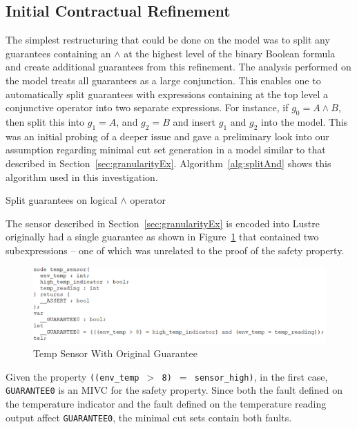 \subsection{Initial Contractual Refinement}
\label{sec:granularityANDAlg}
The simplest restructuring that could be done on the model was to split any guarantees containing an $\land$ at the highest level of the binary Boolean formula and create additional guarantees from this refinement. The analysis performed on the model treats all guarantees as a large conjunction. This enables one to automatically split guarantees with expressions containing at the top level a conjunctive operator into two separate expressions. For instance, if $g_0 = A \land B$, then split this into $g_1 = A$, and $g_2 = B$ and insert $g_1$ and $g_2$ into the model. This was an initial probing of a deeper issue and gave a preliminary look into our assumption regarding minimal cut set generation in a model similar to that described in Section~\ref{sec:granularityEx}. Algorithm~\ref{alg:splitAnd} shows this algorithm used in this investigation. 

\begin{algorithm}[h]

	\caption{Split guarantees on logical $\land$ operator}
	\label{alg:splitAnd}
\end{algorithm}

The sensor described in Section~\ref{sec:granularityEx} is encoded into Lustre originally had a single guarantee as shown in Figure~\ref{fig:lustreOneGuar} that contained two subexpressions -- one of which was unrelated to the proof of the safety property.
\begin{figure}[h!]
\begin{center}
\includegraphics[width=1.0\textwidth]{images/lustreTwoGuar.PNG}
\caption{Temp Sensor With Original Guarantee} \label{fig:lustreOneGuar}
\end{center}
\end{figure} 
Given the property \texttt{((env\_temp $>$ 8) $=$ sensor\_high)}, in the first case, \texttt{GUARANTEE0} is an MIVC for the safety property. Since both the fault defined on the temperature indicator and the fault defined on the temperature reading output affect \texttt{GUARANTEE0}, the minimal cut sets contain both faults. 

